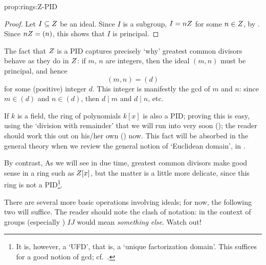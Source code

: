 \begin{prop}{}{prop:rings:Z-PID}
\end{prop}
\begin{proof}
  Let $I \subseteq Z$ be an ideal. Since $I$ is a subgroup, $I = nZ$
  for some $n \in Z$, by . Since
  $nZ = (n)$, this shows that $I$ is principal.
\end{proof}

The fact that $Z$ is a PID captures precisely `why' greatest common
divisors behave as they do in $Z$: if $m$, $n$ are integers, then the
ideal $(m, n)$ must be principal, and hence
\[
  (m, n) = (d)
\]
for some (positive) integer $d$. This integer is manifestly the gcd of
$m$ and $n$: since $m \in (d)$ and $n \in (d)$, then $d \mid m$ and
$d \mid n$, etc.

If $k$ is a field, the ring of polynomials $k[x]$ is also a PID;
proving this is easy, using the `division with remainder' that we will
run into very soon
(); the reader
should work this out on his/her own
() now. This fact will be
absorbed in the general theory when we review the general notion of
`Euclidean domain', in
.

By contrast,  As we will see in due time, greatest common divisors
make good sense in a ring such as $Z[x]$, but the matter is a little
more delicate, since this ring is not a PID\footnote{It is, however, a
  `UFD', that is, a `unique factorization domain'. This suffices for a
  good notion of gcd; cf.\
  .}.

There are several more basic operations involving ideals; for now, the
following two will suffice.
The reader should note the clash of notation: in the context of groups
(especially \Cref{subsec:groups:hk-h-vs-k-h-cap-k}) $IJ$ would mean
\emph{something else}. Watch out!

